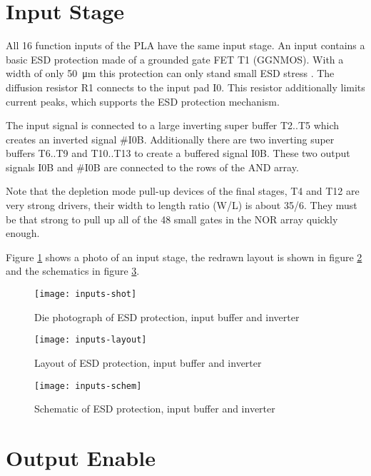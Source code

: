 \clearpage
\section{Input Stage}

All 16 function inputs of the PLA have the same input stage. An input
contains a basic ESD protection made of a grounded gate FET T1 (GGNMOS).
With a width of only \SI{50}{\micro\meter} this protection can only
stand small ESD stress \cite{Sem08}. The diffusion resistor R1 connects to the
input pad I0. This resistor additionally limits current peaks, which supports
the ESD protection mechanism.

The input signal is connected to a large inverting super buffer T2..T5 which
creates an inverted signal \#I0B. Additionally there are two inverting super
buffers T6..T9 and T10..T13 to create a buffered signal I0B. These two output
signals I0B and \#I0B are connected to the rows of the AND array.

Note that the depletion mode pull-up devices of the final stages, T4 and T12
are very strong drivers, their width to length ratio (W/L) is about 35/6.
They must be that strong to pull up all of the 48 small gates in the NOR
array quickly enough.

Figure \ref{fig:inputs-shot} shows a photo of an input stage, the redrawn
layout is shown in figure \ref{fig:inputs-layout} and the schematics in figure
\ref{fig:inputs-schem}.

\begin{figure}
    \centering
    \texttt{[image: inputs-shot]}
    \caption{Die photograph of ESD protection, input buffer and inverter}
    \label{fig:inputs-shot}
\end{figure}


\begin{figure}
    \centering
    \texttt{[image: inputs-layout]}
    \caption{Layout of ESD protection, input buffer and inverter}
    \label{fig:inputs-layout}
\end{figure}

\begin{figure}
    \centering
    \texttt{[image: inputs-schem]}
    \caption{Schematic of ESD protection, input buffer and inverter}
    \label{fig:inputs-schem}
\end{figure}

\clearpage
\section{Output Enable}


